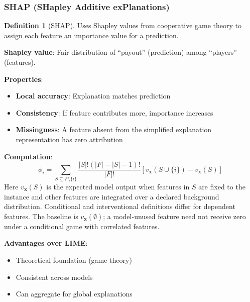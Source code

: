 \documentclass[11pt,twoside]{article}
\numberwithin{equation}{section}
\newcommand{\vect}[1]{\bm{#1}}
\theoremstyle{plain}
\theoremstyle{definition}
\newtheorem{definition}[theorem]{Definition}
\theoremstyle{remark}
\begin{document}
\subsubsection{SHAP (SHapley Additive exPlanations)}

\begin{definition}[SHAP]
Uses Shapley values from cooperative game theory to assign each feature an importance value for a prediction.

\textbf{Shapley value}: Fair distribution of ``payout'' (prediction) among ``players'' (features).

\textbf{Properties}:
\begin{itemize}
\item \textbf{Local accuracy}: Explanation matches prediction
\item \textbf{Consistency}: If feature contributes more, importance increases
\item \textbf{Missingness}: A feature absent from the simplified explanation representation has zero attribution
\end{itemize}

\textbf{Computation}:
\[
\phi_i = \sum_{S \subseteq F \setminus \{i\}} \frac{|S|!(|F|-|S|-1)!}{|F|!}[v_{\vect{x}}(S\cup\{i\})-v_{\vect{x}}(S)]
\]
Here $v_{\vect{x}}(S)$ is the expected model output when features in $S$ are fixed to the instance and other features are integrated over a declared background distribution. Conditional and interventional definitions differ for dependent features. The baseline is $v_{\vect{x}}(\emptyset)$; a model-unused feature need not receive zero under a conditional game with correlated features.

\textbf{Advantages over LIME}:
\begin{itemize}
\item Theoretical foundation (game theory)
\item Consistent across models
\item Can aggregate for global explanations
\end{itemize}
\end{definition}
\end{document}
